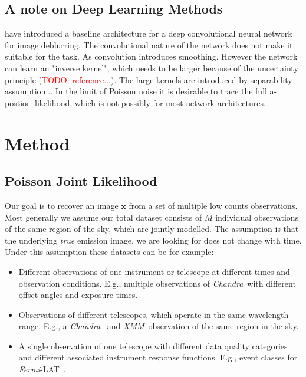 \documentclass[twocolumn]{aastex631}
\newcommand{\chandra}{\textit{Chandra}~}
\newcommand{\xmm}{\textit{XMM}~}
\newcommand{\fermi}{\textit{Fermi}-LAT~}
\newcommand{\todo}[1]{\textcolor{red}{TODO: #1}\PackageWarning{TODO:}{#1!}}
\begin{document}
    

    \subsection{A note on Deep Learning Methods}
    \cite{Li2014} have introduced a baseline architecture for a deep convolutional neural network for image deblurring.
    The convolutional nature of the network does not make it suitable for the task. As convolution introduces smoothing.
    However the network can learn an "inverse kernel", which needs to be larger because of the uncertainty principle (\todo{reference...}).
    The large kernels are introduced by separability assumption...
    In the limit of Poisson noise it is desirable to trace the full a-postiori likelihood, which is not possibly for most network architectures. 

    \section{Method}
    \subsection{Poisson Joint Likelihood}
    Our goal is to recover an image $\mathbf{x}$ from a set of multiple
    low counts observations.
    Most generally we assume our total dataset consists of $M$ individual
    observations of the same region of the sky, which are jointly
    modelled. The assumption is that the underlying \textit{true} emission image,
    we are looking for does not change with time. Under this assumption these
    datasets can be for example:

    \begin{itemize}
        \item Different observations of one instrument or telescope at different times and observation conditions. E.g., multiple observations of \chandra with different offset angles and exposure times.
        \item Observations of different telescopes, which operate in the same wavelength range. E.g., a \chandra
        and \xmm observation of the same region in the sky.
        \item A single observation of one telescope with different data quality categories and different associated instrument
        response functions. E.g., event classes for \fermi.
    \end{itemize}
\end{document}
